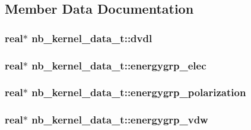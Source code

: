 \subsection{\-Member \-Data \-Documentation}
\hypertarget{structnb__kernel__data__t_a7a5c80a5a255c88f07e8f8ca5f5e5db3}{
\subsubsection[{dvdl}]{\setlength{\rightskip}{0pt plus 5cm}real$\ast$ {\bf nb\-\_\-kernel\-\_\-data\-\_\-t\-::dvdl}}}\label{structnb__kernel__data__t_a7a5c80a5a255c88f07e8f8ca5f5e5db3}
\hypertarget{structnb__kernel__data__t_ac53b1520ed8908e9bd2f0b375dd57705}{
\subsubsection[{energygrp\-\_\-elec}]{\setlength{\rightskip}{0pt plus 5cm}real$\ast$ {\bf nb\-\_\-kernel\-\_\-data\-\_\-t\-::energygrp\-\_\-elec}}}\label{structnb__kernel__data__t_ac53b1520ed8908e9bd2f0b375dd57705}
\hypertarget{structnb__kernel__data__t_ae36e440f86a7dbedf1dbb536536dc16b}{
\subsubsection[{energygrp\-\_\-polarization}]{\setlength{\rightskip}{0pt plus 5cm}real$\ast$ {\bf nb\-\_\-kernel\-\_\-data\-\_\-t\-::energygrp\-\_\-polarization}}}\label{structnb__kernel__data__t_ae36e440f86a7dbedf1dbb536536dc16b}
\hypertarget{structnb__kernel__data__t_adacaa5558e060d6baa3dcd13b0bf4311}{
\subsubsection[{energygrp\-\_\-vdw}]{\setlength{\rightskip}{0pt plus 5cm}real$\ast$ {\bf nb\-\_\-kernel\-\_\-data\-\_\-t\-::energygrp\-\_\-vdw}}}\label{structnb__kernel__data__t_adacaa5558e060d6baa3dcd13b0bf4311}

